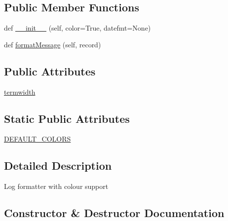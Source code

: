 \subsection*{Public Member Functions}
\begin{DoxyCompactItemize}
\item 
def \hyperlink{classpip_1_1__vendor_1_1pep517_1_1colorlog_1_1LogFormatter_a47cd841c3f484aab6e9d4b56abb23134}{\+\_\+\+\_\+init\+\_\+\+\_\+} (self, color=True, datefmt=None)
\item 
def \hyperlink{classpip_1_1__vendor_1_1pep517_1_1colorlog_1_1LogFormatter_a42e68b82c8501cd4a7faea7637cfbdca}{format\+Message} (self, record)
\end{DoxyCompactItemize}
\subsection*{Public Attributes}
\begin{DoxyCompactItemize}
\item 
\hyperlink{classpip_1_1__vendor_1_1pep517_1_1colorlog_1_1LogFormatter_a78a9bb0a357724c699b99a6059db9dea}{termwidth}
\end{DoxyCompactItemize}
\subsection*{Static Public Attributes}
\begin{DoxyCompactItemize}
\item 
\hyperlink{classpip_1_1__vendor_1_1pep517_1_1colorlog_1_1LogFormatter_a68dba555814a135f50c312362666250a}{D\+E\+F\+A\+U\+L\+T\+\_\+\+C\+O\+L\+O\+RS}
\end{DoxyCompactItemize}


\subsection{Detailed Description}
\begin{DoxyVerb}Log formatter with colour support
\end{DoxyVerb}
 

\subsection{Constructor \& Destructor Documentation}
\mbox{\label{classpip_1_1__vendor_1_1pep517_1_1colorlog_1_1LogFormatter_a47cd841c3f484aab6e9d4b56abb23134}} 
